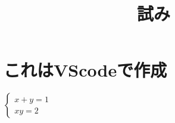 \documentclass[10pt,fleqn,a4paper]{jsarticle}
\title{試み}
\begin{document}
\maketitle
\newpage
\tableofcontents
\newpage
\section{これはVScodeで作成}
$\begin{cases}
    x+y=1\\
    xy=2
\end{cases}$
\end{document}
